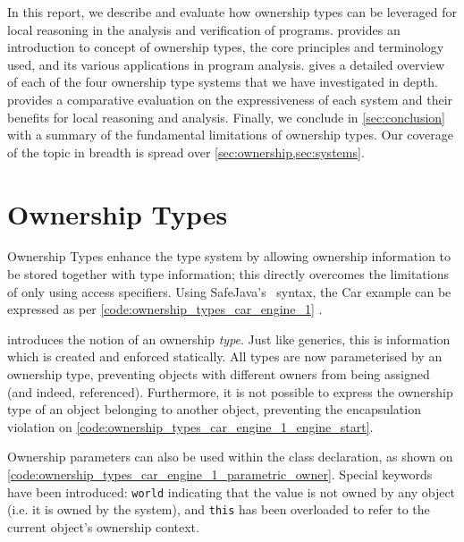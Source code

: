 \documentclass{acm_proc_article-sp}
\begin{document}
In this report, we describe and evaluate how ownership types can be leveraged
for local reasoning in the analysis and verification of programs.
 provides an introduction to concept of ownership types,
the core principles and terminology used, and its various applications in
program analysis.  gives a detailed overview of each of the
four ownership type systems that we have investigated in depth. 
provides a comparative evaluation on the expressiveness of each system and
their benefits for local reasoning and analysis. Finally, we conclude in
\cref{sec:conclusion} with a summary of the fundamental limitations of
ownership types. Our coverage of the topic in breadth is spread over
\cref{sec:ownership,sec:systems}.


\section{Ownership Types}
\label{sec:ownership}

Ownership Types enhance the type system by allowing ownership information to be
stored together with type information; this directly overcomes the limitations
of only using access specifiers. Using SafeJava's~\cite{boyapati04safejava}
syntax, the Car example can be expressed as per
\cref{code:ownership_types_car_engine_1}
.

 introduces the notion of an ownership
\emph{type}. Just like generics, this is information which is created and
enforced statically. All types are now parameterised by an ownership type,
preventing objects with different owners from being assigned (and indeed,
referenced). Furthermore, it is not possible to express the ownership type of
an object belonging to another object, preventing the encapsulation violation
on \cref{code:ownership_types_car_engine_1_engine_start}.



Ownership parameters can also be used within the class declaration, as shown on
\cref{code:ownership_types_car_engine_1_parametric_owner}. Special keywords
have been introduced: \lstinline|world| indicating that the value is not owned
by any object (i.e. it is owned by the system), and \lstinline|this| has been
overloaded to refer to the current object's ownership context.
\end{document}
